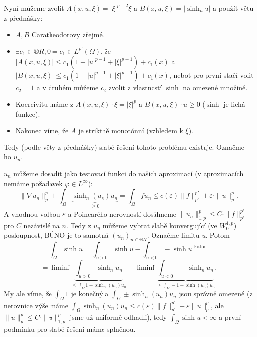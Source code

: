 \documentclass[12pt]{article}					%
\begin{document}
\begin{priklad}
\begin{dukazin}
			Nyní můžeme zvolit $A(x, u, ξ) = |ξ|^{p - 2}ξ$ a $B(x, u, ξ) = |\sinh_n u|$ a použít větu z přednášky:
			\begin{itemize}
				\item $A, B$ Caratheodorovy zřejmé.
				\item $\exists c_1 \in ®R, 0 = c_1 \in L^{p'}(Ω)$, že $|A(x, u, ξ)| ≤ c_1(1 + |u|^{p-1} + |ξ|^{p-1}) + c_1(x)$ a $|B(x, u, ξ)| ≤ c_1(1 + |u|^{p-1} + |ξ|^{p-1}) + c_1(x)$, neboť pro první stačí volit $c_2 = 1$ a v druhém můžeme $c_2$ zvolit z vlastností $\sinh$ na omezené množině.
				\item Koercivitu máme z $A(x, u, ξ)·ξ = |ξ|^p$ a $B(x, u, ξ)·u ≥ 0$ ($\sinh$ je lichá funkce).
				\item Nakonec víme, že $A$ je striktně monotónní (vzhledem k $ξ$).
			\end{itemize}
			Tedy (podle věty z přednášky) slabé řešení tohoto problému existuje. Označme ho $u_n$.
		\end{dukazin}

		\begin{dukazin}
			$u_n$ můžeme dosadit jako testovací funkci do našich aproximací (v aproximacích nemáme požadavek $φ \in L^∞$):
			$$ \|\nabla u_n\|_p^p + \int_Ω \underbrace{\sinh_n(u_n)u_n}_{≥0} = \int_Ω f u_n ≤ c(ε)\|f\|_{p'}^{p'} + ε·\|u\|_p^p. $$
			A vhodnou volbou $ε$ a Poincarého nerovností dosáhneme $\|u_n\|_{1, p}^p ≤ C · \|f\|_{p'}^{p'}$ pro $C$ nezávislé na $n$. Tedy z $u_n$ můžeme vybrat slabě konvergující (ve $W^{1, p}_0$) posloupnost, BÚNO je to samotná $(u_n)_{n \in ®N}$. Označme limitu $u$. Potom
			$$ \int_Ω \sinh u = \int_{u > 0} \sinh u - \int_{u < 0} -\sinh u \overset{\text{Fatou}}= $$
			$$ = \liminf \underbrace{\int_{u > 0} \sinh_n u_n}_{≤ \int_Ω 1 + \sinh_n(u_n) u_n} - \liminf \underbrace{\int_{u < 0} - \sinh_n u_n}_{≥ \int_Ω -1 - \sinh(u_n) u_n}. $$
			My ale víme, že $\int_Ω 1$ je konečný a $\int_Ω ±\sinh_n(u_n) u_n$ jsou správně omezené (z nerovnice výše máme $\int_Ω \sinh_n(u_n) u_n ≤ c(ε) \|f\|_{p'}^{p'} + ε\|u\|_p^p$, ale $\|u\|_p^p ≤ C·\|u\|_{1, p}^p$ jsme už uniformě odhadli), tedy $\int_Ω \sinh u < ∞$ a první podmínku pro slabé řešení máme splněnou.
		\end{dukazin}


\end{priklad}
\end{document}
